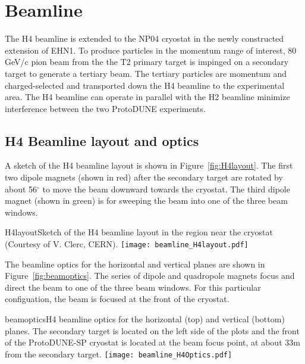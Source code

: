 \section{Beamline}
\label{sec:h4beamline}

The H4 beamline is extended to the NP04 cryostat in the newly constructed extension of EHN1. To produce particles in the momentum range of interest, 80 GeV/c pion beam from the the T2 primary target is impinged on a secondary target to generate a tertiary beam. The tertiary particles are momentum and charged-selected and transported down the H4 beamline to the experimental area. The H4 beamline can operate in parallel with the H2 beamline minimize interference between the two ProtoDUNE experiments.

\subsection{H4 Beamline layout and optics}

A sketch of the H4 beamline layout is shown in Figure~\ref{fig:H4layout}. The first two dipole magnets (shown in red) after the secondary target are rotated by about 56$^\circ$ to move the beam downward towards the cryostat. The third dipole magnet (shown in green) is for sweeping the beam into one of the three beam windows.
\begin{cdrfigure}{H4layout}{Sketch of the H4 beamline layout in the region near the cryostat (Courtesy of V. Clerc, CERN).}
  \texttt{[image: beamline\_H4layout.pdf]}
\end{cdrfigure}


The beamline optics for the horizontal and vertical planes are shown in Figure~\ref{fig:beamoptics}. The series of dipole and quadropole magnets focus and direct the beam to one of the three beam windows. For this particular configuation, the beam is focused at the front of the cryostat.
\begin{cdrfigure}{beamoptics}{H4 beamline optics for the horizontal (top) and vertical (bottom) planes. The secondary target is located on the left side of the plots and the front of the ProtoDUNE-SP cryostat is located at the beam focus point, at about 33m from the secondary target.}
  \texttt{[image: beamline\_H4Optics.pdf]}
\end{cdrfigure}

